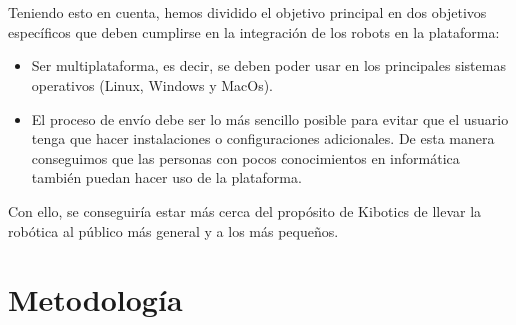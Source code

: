 \documentclass{report}
\begin{document}
\\
\\
Teniendo esto en cuenta, hemos dividido el objetivo principal en dos objetivos específicos que deben cumplirse en la integración de los robots en la plataforma:
\begin{itemize}
	\item Ser multiplataforma, es decir, se deben poder usar en los principales sistemas operativos (Linux, Windows y MacOs).
	\item El proceso de envío debe ser lo más sencillo posible para evitar que el usuario tenga que hacer instalaciones o configuraciones adicionales. De esta manera conseguimos que las personas con pocos conocimientos en informática también puedan hacer uso de la plataforma.
\end{itemize}
Con ello, se conseguiría estar más cerca del propósito de Kibotics de llevar la robótica al público más general y a los más pequeños.

\section{Metodología}
\end{document}
